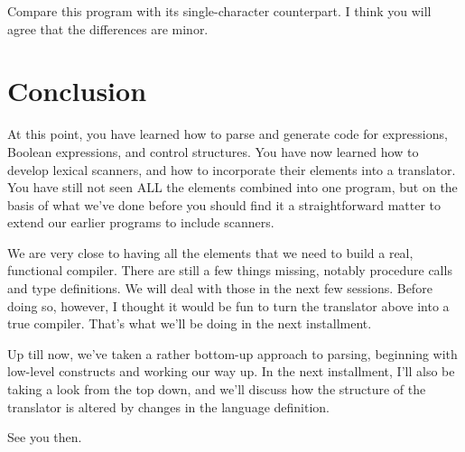 \documentclass[float=false, crop=false]{standalone}
\begin{document}
Compare this program with its single-character counterpart. I think you will
agree that the differences are minor.

\section{Conclusion}

At this point, you have learned how to parse and generate code for expressions,
Boolean expressions, and control structures. You have now learned how to develop
lexical scanners, and how to incorporate their elements into a translator. You
have still not seen ALL the elements combined into one program, but on the basis
of what we've done before you should find it a straightforward matter to extend
our earlier programs to include scanners.

We are very close to having all the elements that we need to build a real,
functional compiler. There are still a few things missing, notably procedure
calls and type definitions. We will deal with those in the next few sessions.
Before doing so, however, I thought it would be fun to turn the translator above
into a true compiler. That's what we'll be doing in the next installment.

Up till now, we've taken a rather bottom-up approach to parsing, beginning with
low-level constructs and working our way up. In the next installment, I'll also
be taking a look from the top down, and we'll discuss how the structure of the
translator is altered by changes in the language definition.

See you then.
\end{document}
